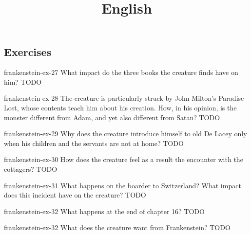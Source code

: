 \documentclass[preview]{standalone}
\begin{document}
\title{English}
\genpage

\subsection{Exercises}

\begin{snippetexercise}{frankenstein-ex-27}
    {What impact do the three books the creature finds have on him?}
    TODO 
\end{snippetexercise}

\begin{snippetexercise}{frankenstein-ex-28}
    {The creature is particularly struck by John Milton's Paradise Lost, whose contents teach him about his
    creation. How, in his opinion, is the monster different from Adam, and yet also different from Satan?}
    TODO 
\end{snippetexercise}

\begin{snippetexercise}{frankenstein-ex-29}
    {Why does the creature introduce himself to old De Lacey only when his children and the servants are not
    at home?}
    TODO 
\end{snippetexercise}

\begin{snippetexercise}{frankenstein-ex-30}
    {How does the creature feel as a result the encounter with the cottagers?}
    TODO 
\end{snippetexercise}

\begin{snippetexercise}{frankenstein-ex-31}
    {What happens on the boarder to Switzerland? What impact does this incident have on the creature?}
    TODO 
\end{snippetexercise}

\begin{snippetexercise}{frankenstein-ex-32}
    {What happens at the end of chapter 16?}
    TODO 
\end{snippetexercise}

\begin{snippetexercise}{frankenstein-ex-32}
    {What does the creature want from Frankenstein?}
    TODO 
\end{snippetexercise}
\end{document}
